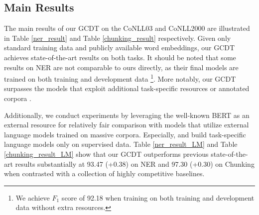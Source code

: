 \documentclass[11pt,a4paper]{article}
\begin{document}
\subsection{Main Results}
The main results of our GCDT on the CoNLL03 and CoNLL2000 are illustrated in Table \ref{ner_result} and Table \ref{chunking_result} respectively. 
Given only standard training data and publicly available word embeddings, our GCDT achieves state-of-the-art results on both tasks. It should be noted that some results on NER are not comparable to ours directly, as their final models are trained on both training and development data \footnote{We achieve $F_1$ score of 92.18 when training on both training and development data without extra resources.}. More notably, our GCDT surpasses the models that exploit additional task-specific resources or annotated corpora \cite{joint_Luo2015,Transfer_Yang2017,char-CNN+BLSTM}.

Additionally, we conduct experiments by leveraging the well-known BERT as an external resource for relatively fair comparison with models that utilize external language models trained on massive corpora.
Especially, \citeauthor{LM_no_annotation}  and   \citeauthor{LM_liu2017}  build task-specific language models only on supervised data.
Table \ref{ner_result_LM} and Table \ref{chunking_result_LM} show that our GCDT outperforms previous state-of-the-art results substantially at 93.47 (+0.38) on NER and 97.30 (+0.30) on Chunking when contrasted with a collection of highly competitive baselines.
\end{document}
